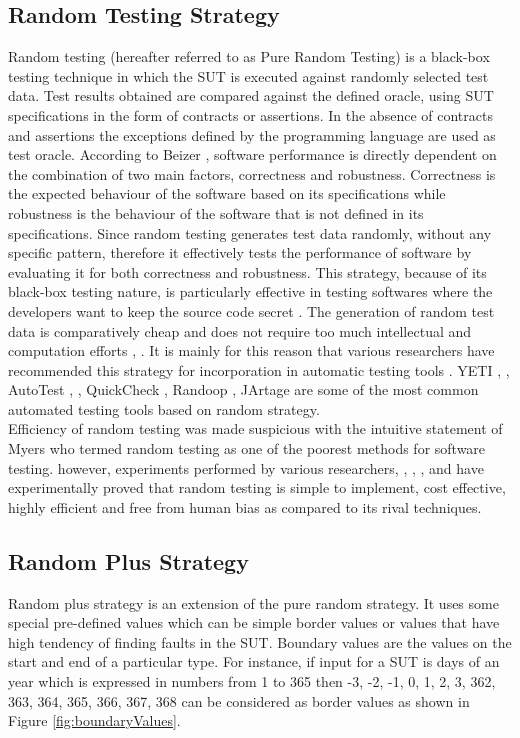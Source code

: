 \documentclass[conference]{IEEEtran}
\begin{document}
\subsection{Random Testing Strategy}
Random testing (hereafter referred to as Pure Random Testing) is a black-box testing technique in which the SUT is executed against randomly selected test data. Test results obtained are compared against the defined oracle, using SUT specifications in the form of contracts or assertions. In the absence of contracts and assertions the exceptions defined by the programming language are used as test oracle. According to Beizer \cite{Beizer1990}, software performance is directly dependent on the combination of two main factors, correctness and robustness. Correctness is the expected behaviour of the software based on its specifications while robustness is the behaviour of the software that is not defined in its specifications. Since random testing generates test data randomly, without any specific pattern, therefore it effectively tests the performance of software by evaluating it for both correctness and robustness. This strategy, because of its black-box testing nature, is particularly effective in testing softwares where the developers want to keep the source code secret \cite{Chen2010}. The generation of random test data is comparatively cheap and does not require too much intellectual and computation efforts \cite{Ciupa2009}, \cite{Ciupa2008}. It is mainly for this reason that various researchers have recommended this strategy for incorporation in automatic testing tools \cite{Ciupa2008a}. YETI \cite{Oriol2010a}, \cite{Oriol2010}, AutoTest \cite{Leitner2007}, \cite{Ciupa2007}, QuickCheck \cite{Claessen2000}, Randoop \cite{Pacheco2007}, JArtage \cite{Oriat2004} are some of the most common automated testing tools based on random strategy.\\
\indent Efficiency of random testing was made suspicious with the intuitive statement of Myers \cite{Myers2004} who termed random testing as one of the poorest methods for software testing. however, experiments performed by various researchers, \cite{Ciupa2007}, \cite{Duran1981}, \cite{Duran1984}, \cite{Hamlet1994} and \cite{Ntafos2001} have experimentally proved that random testing is simple to implement, cost effective, highly efficient and free from human bias as compared to its rival techniques. 

\subsection{Random Plus Strategy}
Random plus strategy \cite{Leitner2007} is an extension of the pure random strategy. It uses some special pre-defined values which can be simple border values or values that have high tendency of finding faults in the SUT. Boundary values \cite{Beizer1990} are the values on the start and end of a particular type. For instance, if input for a SUT is days of an year which is expressed in numbers from 1 to 365 then -3, -2, -1, 0, 1, 2, 3, 362, 363, 364, 365, 366, 367, 368 can be considered as border values as shown in Figure \ref{fig:boundaryValues}. 
\end{document}
